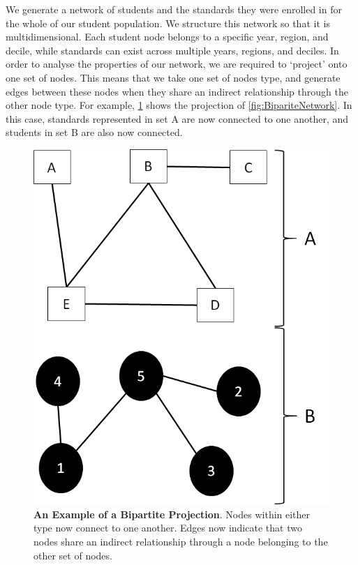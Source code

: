 We generate a network of students and the standards they were enrolled in for the whole of our student population. We structure this network so that it is multidimensional. Each student node belongs to a specific year, region, and decile, while standards can exist across multiple years, regions, and deciles. In order to analyse the properties of our network, we are required to `project' onto one set of nodes. This means that we take one set of nodes type, and generate edges between these nodes when they share an indirect relationship through the other node type. For example, \ref{fig:BipartiteNetwork_Projection} shows the projection of \ref{fig:BipariteNetwork}. In this case, standards represented in set A are now connected to one another, and students in set B are also now connected. 
\begin{figure}
    \centering
    \includegraphics{C2 - Student Pathways/Bipartite_Network_Projection.png}
    \caption{\textbf{An Example of a Bipartite Projection}. Nodes within either type now connect to one another. Edges now indicate that two nodes share an indirect relationship through a node belonging to the other set of nodes.}
    \label{fig:BipartiteNetwork_Projection}
\end{figure}
